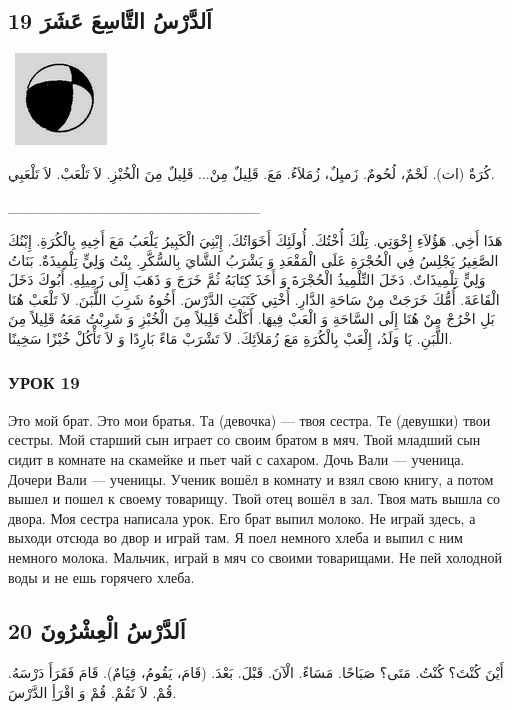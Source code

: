 \documentclass[a5paper]{article}
\begin{document}
\subsection{19 اَلدَّرْسُ التَّاسِعَ عَشَرَ}
\  \includegraphics[width=0.9583in,height=0.9583in]{images/MuhammadBagauddinprettified-img034.jpg} 

كُرَةٌ (ات). لَحْمٌ، لُحُومٌ. زَميِلٌ، زُمَلاَءُ. مَعَ. قَلِيلٌ مِنْ... قَلِيلٌ مِنَ الْخُبْزِ. لاَ تَلْعَبْ. لاَ تَلْعَبِي.

\_\_\_\_\_\_\_\_\_\_\_\_\_\_\_\_\_\_\_\_\_\_\_\_

هَذَا أَخِي. هَؤُلاَءِ إِخْوَتِي. تِلْكَ أُخْتُكَ. أُولَئِكَ أَخَوَاتُكَ. إِبْنِيَ الْكَبِيرُ يَلْعَبُ مَعَ أَخِيهِ بِالْكُرَةِ. إِبْنُكَ الصَّغِيرُ يَجْلِسُ فِي الْحُجْرَةِ عَلَى الْمَقْعَدِ وَ يَشْرَبُ الشَّايَ بِالسُّكَّرِ. بِنْتُ وَلِيٍّ تِلْمِيذَةٌ. بَنَاتُ وَلِيٍّ تِلْمِيذَاتٌ. دَخَلَ التِّلْمِيذُ الْحُجْرَةَ وَ أَخَذَ كِتَابَهُ ثُمَّ خَرَجَ وَ ذَهَبَ إِلَى زَمِيلِهِ. أَبُوكَ دَخَلَ الْقَاعَةَ. أُمُّكَ خَرَجَتْ مِنْ سَاحَةِ الدَّارِ. أُخْتِي كَتَبَتِ الدَّرْسَ. أَخُوهُ شَرِبَ اللَّبَنَ. لاَ تَلْعَبْ هُنَا بَلِ اخْرُجْ مِنْ هُنَا إِلَى السَّاحَةِ وَ الْعَبْ فِيهَا. أَكَلْتُ قَلِيلاً مِنَ الْخُبْزِ وَ شَرِبْتُ مَعَهُ قَلِيلاً مِنَ اللَّبَنِ. يَا وَلَدُ، إِلْعَبْ بِالْكُرَةِ مَعَ زُمَلاَئِكَ. لاَ تَشْرَبْ مَاءً بَارِدًا وَ لاَ تَأْكُلْ خُبْزًا سَخِينًا.

\subsubsection{УРОК 19}
Это мой брат. Это мои братья. Та (девочка) — твоя сестра. Те (девушки) твои сестры. Мой старший сын играет со своим братом в мяч. Твой младший сын сидит в комнате на скамейке и пьет чай с сахаром. Дочь Вали — ученица. Дочери Вали — ученицы. Ученик вошёл в комнату и взял свою книгу, а потом вышел и пошел к своему товарищу. Твой отец вошёл в зал. Твоя мать вышла со двора. Моя сестра написала урок. Его брат выпил молоко. Не играй здесь, а выходи отсюда во двор и играй там. Я поел немного хлеба и выпил с ним немного молока. Мальчик, играй в мяч со своими товарищами. Не пей холодной воды и не ешь горячего хлеба.

\subsection{20 اَلدَّرْسُ الْعِشْرُونَ}
أَيْنَ كُنْتَ؟ كُنْتُ. مَتَى؟ صَبَاحًا. مَسَاءً. الْآنَ. قَبْلَ. بَعْدَ. (قَامَ، يَقُومُ، قِيَامٌ). قَامَ فَقَرَأَ دَرْسَهُ. قُمْ. لاَ تَقُمْ. قُمْ وَ اقْرَأِ الدَّرْسَ.
\end{document}
